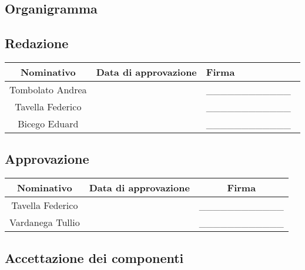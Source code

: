 \documentclass[../PianoProgetto.tex]{subfiles}
\begin{document}
\begin{appendices}
\section{Organigramma}
	\subsection{Redazione}
		\begin{table}[h]
		\begin{tabularx}{\textwidth}{C C X}
			\toprule
			\textbf{Nominativo} & \textbf{Data di approvazione} & \textbf{Firma} \\
			\midrule
			Tombolato Andrea &  & \_\_\_\_\_\_\_\_\_\_\_\_\ \\[1ex]
			\midrule
			Tavella Federico &  & \_\_\_\_\_\_\_\_\_\_\_\_\ \\[1ex]
			\midrule
			Bicego Eduard &  & \_\_\_\_\_\_\_\_\_\_\_\_\ \\[1ex]
			\bottomrule
		\end{tabularx}
		
	\end{table}
	

	
	\subsection{Approvazione}
	
		\begin{table}[h]

	
		\begin{tabularx}{\textwidth}{C C C}
			\toprule
			\textbf{Nominativo} & \textbf{Data di approvazione} & \textbf{Firma} \\
			\midrule
			Tavella Federico &  & \_\_\_\_\_\_\_\_\_\_\_\_ \\[1ex]
			Vardanega Tullio &  & \_\_\_\_\_\_\_\_\_\_\_\_ \\[1ex]
			\bottomrule
		\end{tabularx}
		
	\end{table}		
	
	\subsection{Accettazione dei componenti}
	
		\begin{table}[h]
	

\end{table}
\end{appendices}
\end{document}
